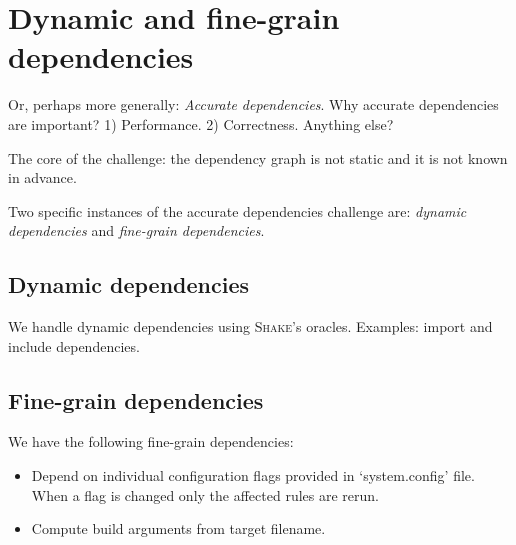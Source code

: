 \section{Dynamic and fine-grain dependencies\label{section-dependencies}}
Or, perhaps more generally: \emph{Accurate dependencies}. Why accurate
dependencies are important? 1) Performance. 2) Correctness. Anything else?

The core of the challenge: the dependency graph is not static and it is not
known in advance.

Two specific instances of the accurate dependencies challenge are: \emph{dynamic
dependencies} and \emph{fine-grain dependencies}.

\subsection{Dynamic dependencies}

We handle dynamic dependencies using \textsc{Shake}'s oracles. Examples: import
and include dependencies.

\subsection{Fine-grain dependencies}

We have the following fine-grain dependencies:
\begin{itemize}
  \item Depend on individual configuration flags provided in `system.config'
  file. When a flag is changed only the affected rules are rerun.
  \item Compute build arguments from target filename.
\end{itemize}
